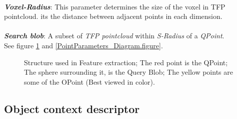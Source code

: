 \\
\textbf{\textit{Voxel-Radius}}: This parameter determines the size of the voxel in TFP pointcloud. its the distance between adjacent points in each dimension.\\
\\
\textbf{\textit{Search blob}}: A subset of {\it TFP pointcloud} within {\it S-Radius} of a {\it QPoint}. 
\\

See figure \ref{FEStructure.figure} and \ref{PointParameters_Diagram.figure}.

\begin{figure}[t]
  \caption[Illustration of the items used in Feature Extract.]
  {Structure used in Feature extraction; The red point is the QPoint; The sphere surrounding it, is the Query Blob; The yellow
  points are some of the OPoint (Best viewed in color).}
  \label{FEStructure.figure}
\end{figure}



\subsection{Object context descriptor}
\label{OCD.ssec}
 
